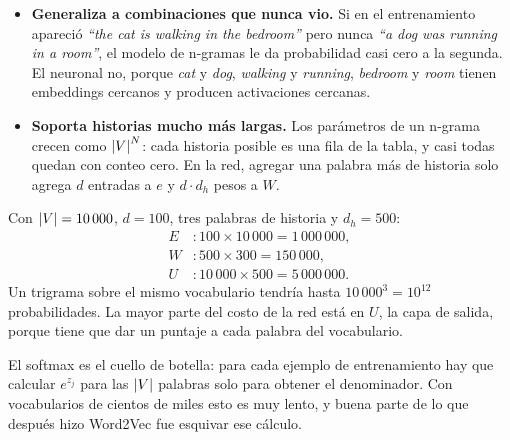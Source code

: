 \documentclass[11pt,letterpaper]{article}
\begin{document}
\begin{itemize}[itemsep=0.3em]
    \item \textbf{Generaliza a combinaciones que nunca vio.} Si en el
          entrenamiento apareció \textit{``the cat is walking in the
          bedroom''} pero nunca \textit{``a dog was running in a
          room''}, el modelo de n-gramas le da probabilidad casi cero a
          la segunda. El neuronal no, porque \textit{cat} y
          \textit{dog}, \textit{walking} y \textit{running},
          \textit{bedroom} y \textit{room} tienen embeddings cercanos y
          producen activaciones cercanas.
    \item \textbf{Soporta historias mucho más largas.} Los parámetros
          de un n-grama crecen como $\left\lvert V \right\rvert^N$: cada historia posible
          es una fila de la tabla, y casi todas quedan con conteo cero.
          En la red, agregar una palabra más de historia solo agrega
          $d$ entradas a $e$ y $d \cdot d_h$ pesos a $W$.
\end{itemize}

\begin{ejemplo}
    Con $\left\lvert V \right\rvert = 10\,000$, $d = 100$, tres palabras de historia y
    $d_h = 500$:
    \begin{align*}
        E &: 100 \times 10\,000 = 1\,000\,000 , \\
        W &: 500 \times 300 = 150\,000 , \\
        U &: 10\,000 \times 500 = 5\,000\,000 .
    \end{align*}
    Un trigrama sobre el mismo vocabulario tendría hasta
    $10\,000^3 = 10^{12}$ probabilidades. La mayor parte del costo de
    la red está en $U$, la capa de salida, porque tiene que dar un
    puntaje a cada palabra del vocabulario.
\end{ejemplo}

\begin{ojo}
    El softmax es el cuello de botella: para cada ejemplo de
    entrenamiento hay que calcular $e^{z_j}$ para las $\left\lvert V \right\rvert$
    palabras solo para obtener el denominador. Con vocabularios de
    cientos de miles esto es muy lento, y buena parte de lo que
    después hizo Word2Vec fue esquivar ese cálculo.
\end{ojo}


\newpage
\end{document}
